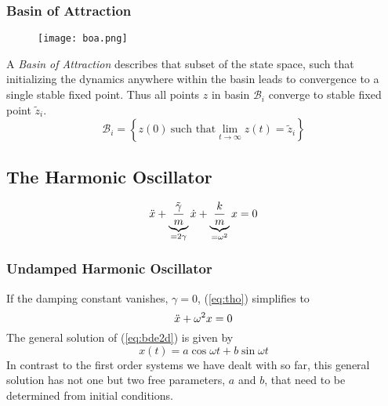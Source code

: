 \subsubsection*{Basin of Attraction}
\begin{wrapfigure}{r}{0.3\linewidth}
	\centering
	\texttt{[image: boa.png]}
\end{wrapfigure}
A \emph{Basin of Attraction} describes that subset of the state space, such that initializing
the dynamics anywhere within the basin leads to convergence to a single
stable fixed point.
Thus all points $z$ in basin $\mathcal{B}_i$ converge to stable fixed point $\tilde{z}_i$.
\begin{equation}
	\mathcal{B}_i=\left\{z(0)\ \text{such that} \lim_{t\rightarrow\infty} z(t)=\tilde{z}_i \right\}
\end{equation}
\subsection{The Harmonic Oscillator}
\begin{equation}{\label{eq:tho}}
	\ddot{x}+\underbrace{\frac{\tilde{\gamma}}{m}}_{=2\gamma}\dot{x}+\underbrace{\frac{k}{m}}_{=\omega^2}x=0
\end{equation}
\subsubsection{Undamped Harmonic Oscillator}
If the damping constant vanishes, $\gamma=0$, (\ref{eq:tho}) simplifies to
\begin{equation}{\label{eq:bde2d}}
	\ddot{x}+\omega^2 x=0 
\end{equation}
The general solution of (\ref{eq:bde2d}) is given by
\begin{equation}
	x(t)=a\cos\omega t+b\sin\omega t
\end{equation}
In contrast to the first order systems we have dealt with so far, this general solution has not one but two free parameters, $a$ and $b$, that need to be determined from initial conditions.
